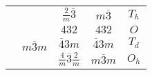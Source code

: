 \begin{table}[h]
\begin{tabular}{lcccc}
                               &                                 & $\displaystyle \frac{2}{m}\overline{3}$ & $m\overline{3}$ & $T_h$ \\
                               \cline{2-5}
							  & \multirow{3}{*}{$m\overline{3}m$} & $432$ & $432$ & $O$\\
                               &                                 & $\overline{4}3m$ & $\overline{4}3m$ & $T_d$ \\
                               &                                 & $\displaystyle \frac{4}{m}\overline{3}\frac{2}{m}$ & $m\overline{3}m$ & $O_h$ \\ [1.5ex]
    \hline  
  \end{tabular}
\end{table}




